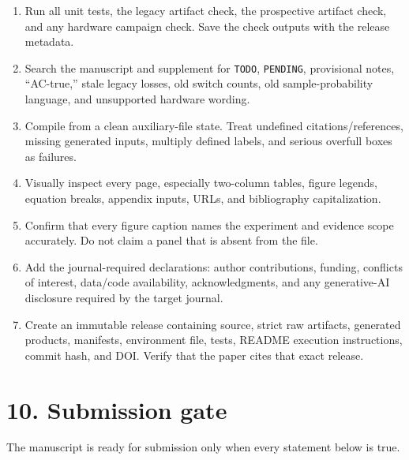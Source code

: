 \documentclass[11pt]{article}
\newcommand{\file}[1]{\path{#1}}
\begin{document}
\begin{enumerate}
  \item Run all unit tests, the legacy artifact check, the prospective artifact
  check, and any hardware campaign check.  Save the check outputs with the
  release metadata.
  \item Search the manuscript and supplement for
  \texttt{TODO}, \texttt{PENDING}, provisional notes, ``AC-true,'' stale
  legacy losses, old switch counts, old sample-probability language, and
  unsupported hardware wording.
  \item Compile \file{main_2.tex} from a clean auxiliary-file state.  Treat
  undefined citations/references, missing generated inputs, multiply defined
  labels, and serious overfull boxes as failures.
  \item Visually inspect every page, especially two-column tables, figure
  legends, equation breaks, appendix inputs, URLs, and bibliography
  capitalization.
  \item Confirm that every figure caption names the experiment and evidence
  scope accurately.  Do not claim a panel that is absent from the file.
  \item Add the journal-required declarations: author contributions, funding,
  conflicts of interest, data/code availability, acknowledgments, and any
  generative-AI disclosure required by the target journal.
  \item Create an immutable release containing source, strict raw artifacts,
  generated products, manifests, environment file, tests, README execution
  instructions, commit hash, and DOI.  Verify that the paper cites that exact
  release.
\end{enumerate}

\section*{10. Submission gate}

The manuscript is ready for submission only when every statement below is
true.
\end{document}
